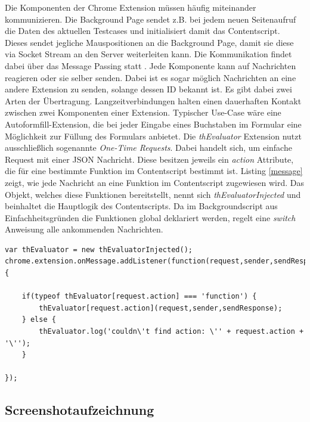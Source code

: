 Die Komponenten der Chrome Extension müssen häufig miteinander kommunizieren. Die Background Page sendet z.B. bei jedem neuen Seitenaufruf die Daten des aktuellen Testcases und initialisiert damit das Contentscript. Dieses sendet jegliche Mauspositionen an die Background Page, damit sie diese via Socket Stream an den Server weiterleiten kann. Die Kommunikation findet dabei über das Message Passing statt \cite{messagePassing}. Jede Komponente kann auf Nachrichten reagieren oder sie selber senden. Dabei ist es sogar möglich Nachrichten an eine andere Extension zu senden, solange dessen ID bekannt ist. Es gibt dabei zwei Arten der Übertragung. Langzeitverbindungen halten einen dauerhaften Kontakt zwischen zwei Komponenten einer Extension. Typischer Use-Case wäre eine Autoformfill-Extension, die bei jeder Eingabe eines Buchstaben im Formular eine Möglichkeit zur Füllung des Formulars anbietet. Die \textit{thEvaluator} Extension nutzt ausschließlich sogenannte \textit{One-Time Requests}. Dabei handelt sich, um einfache Request mit einer JSON Nachricht. Diese besitzen jeweils ein \textit{action} Attribute, die für eine bestimmte Funktion im Contentscript bestimmt ist. Listing \ref{message} zeigt, wie jede Nachricht an eine Funktion im Contentscript zugewiesen wird. Das Objekt, welches diese Funktionen bereitstellt, nennt sich \textit{thEvaluatorInjected} und beinhaltet die Hauptlogik des Contentscripts. Da im Backgroundscript aus Einfachheitsgründen die Funktionen global deklariert werden, regelt eine \textit{switch} Anweisung alle ankommenden Nachrichten.
\\
\begin{lstlisting}[caption=Message Handeling im Contentscript,label=message]
var thEvaluator = new thEvaluatorInjected();
chrome.extension.onMessage.addListener(function(request,sender,sendResponse){

    if(typeof thEvaluator[request.action] === 'function') {
        thEvaluator[request.action](request,sender,sendResponse);
    } else {
        thEvaluator.log('couldn\'t find action: \'' + request.action + '\'');
    }

});
\end{lstlisting}

\subsection{Screenshotaufzeichnung}

